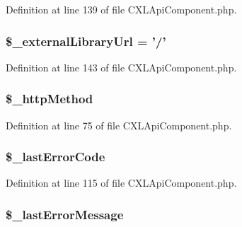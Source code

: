Definition at line 139 of file CXLApiComponent.php.

\hypertarget{classCXLApiComponent_aae8a45534cedd7fc0881ca1995d8bb9c}{
\subsubsection[{\$\_\-externalLibraryUrl}]{\setlength{\rightskip}{0pt plus 5cm}\$\_\-externalLibraryUrl = '/'}}
\label{classCXLApiComponent_aae8a45534cedd7fc0881ca1995d8bb9c}


Definition at line 143 of file CXLApiComponent.php.

\hypertarget{classCXLApiComponent_a1fa7e8f053c645c627f16bcf41f2416a}{
\subsubsection[{\$\_\-httpMethod}]{\setlength{\rightskip}{0pt plus 5cm}\$\_\-httpMethod}}
\label{classCXLApiComponent_a1fa7e8f053c645c627f16bcf41f2416a}


Definition at line 75 of file CXLApiComponent.php.

\hypertarget{classCXLApiComponent_a9d205559114adfd52ac69bbb094a8a1a}{
\subsubsection[{\$\_\-lastErrorCode}]{\setlength{\rightskip}{0pt plus 5cm}\$\_\-lastErrorCode}}
\label{classCXLApiComponent_a9d205559114adfd52ac69bbb094a8a1a}


Definition at line 115 of file CXLApiComponent.php.

\hypertarget{classCXLApiComponent_a204d1af51663d8a1317949e796fe5fca}{
\subsubsection[{\$\_\-lastErrorMessage}]{\setlength{\rightskip}{0pt plus 5cm}\$\_\-lastErrorMessage}}
\label{classCXLApiComponent_a204d1af51663d8a1317949e796fe5fca}


